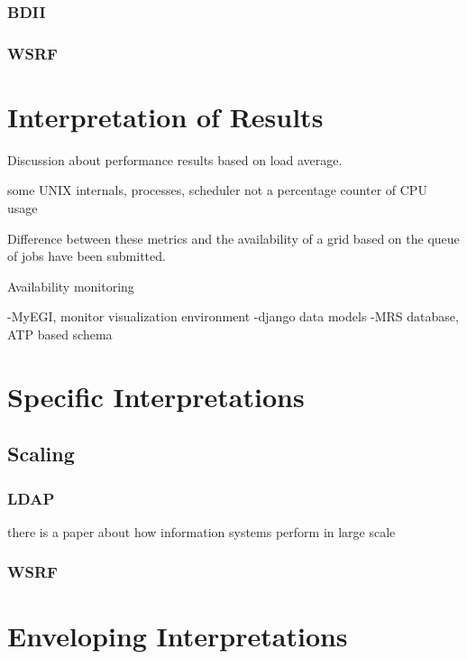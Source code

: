\subsubsection{BDII}

\subsubsection{WSRF}


\section{Interpretation of Results}


Discussion about performance results based on
load average.

some UNIX internals, processes, scheduler
not a percentage counter of CPU usage


Difference between these metrics and the availability of 
a grid based on the queue of jobs have been submitted.

Availability monitoring

-MyEGI, monitor visualization environment
-django data models
-MRS database, ATP based schema


\section{Specific Interpretations}

\subsection{Scaling}
\subsubsection{LDAP}

there is a paper about how information systems perform in large scale


\subsubsection{WSRF}
\section{Enveloping Interpretations}
